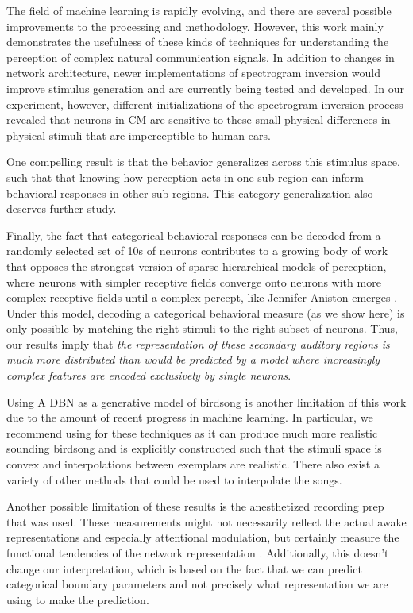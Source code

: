 The field of machine learning is rapidly evolving, and there are several possible improvements to the processing and methodology. However, this work mainly demonstrates the usefulness of these kinds of techniques for understanding the perception of complex natural communication signals. In addition to changes in network architecture, newer implementations of spectrogram inversion would improve stimulus generation and are currently being tested and developed. In our experiment, however, different initializations of the spectrogram inversion process revealed that neurons in \ac{CM} are sensitive to these small physical differences in physical stimuli that are imperceptible to human ears.

One compelling result is that the behavior generalizes across this stimulus space, such that that knowing how perception acts in one sub-region can inform behavioral responses in other sub-regions. This category generalization also deserves further study.

Finally, the fact that categorical behavioral responses can be decoded from a randomly selected set of 10s of neurons contributes to a growing body of work \cite{jeanne2011emergence,kozlov2016central} that opposes the strongest version of sparse hierarchical models of perception, where neurons with simpler receptive fields converge onto neurons with more complex receptive fields until a complex percept, like Jennifer Aniston emerges \cite{quiroga2005invariant}. Under this model, decoding a categorical behavioral measure (as we show here) is only possible by matching the right stimuli to the right subset of neurons. Thus, our results imply that \emph{the representation of these secondary auditory regions is much more distributed than would be predicted by a model where increasingly complex features are encoded exclusively by single neurons}.

Using A DBN as a generative model of birdsong is another limitation of this work due to the amount of recent progress in machine learning. In particular, we recommend using \cite{GAIA} for these techniques as it can produce much more realistic sounding birdsong and is explicitly constructed such that the stimuli space is convex and interpolations between exemplars are realistic. There also exist a variety of other methods\cite{STRAIGHT, waveglow} that could be used to interpolate the songs.

Another possible limitation of these results is the anesthetized recording prep that was used. These measurements might not necessarily reflect the actual awake representations and especially attentional modulation, but certainly measure the functional tendencies of the network representation \cite{bluvas2013attention,knudsen2013active}. Additionally, this doesn't change our interpretation, which is based on the fact that we can predict categorical boundary parameters and not precisely what representation we are using to make the prediction.


